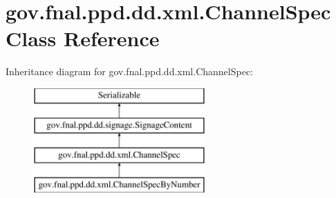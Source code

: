 \hypertarget{classgov_1_1fnal_1_1ppd_1_1dd_1_1xml_1_1ChannelSpec}{\section{gov.\-fnal.\-ppd.\-dd.\-xml.\-Channel\-Spec Class Reference}
\label{classgov_1_1fnal_1_1ppd_1_1dd_1_1xml_1_1ChannelSpec}
}
Inheritance diagram for gov.\-fnal.\-ppd.\-dd.\-xml.\-Channel\-Spec\-:\begin{figure}[H]
\begin{center}
\leavevmode
\includegraphics[height=4.000000cm]{classgov_1_1fnal_1_1ppd_1_1dd_1_1xml_1_1ChannelSpec}
\end{center}
\end{figure}
